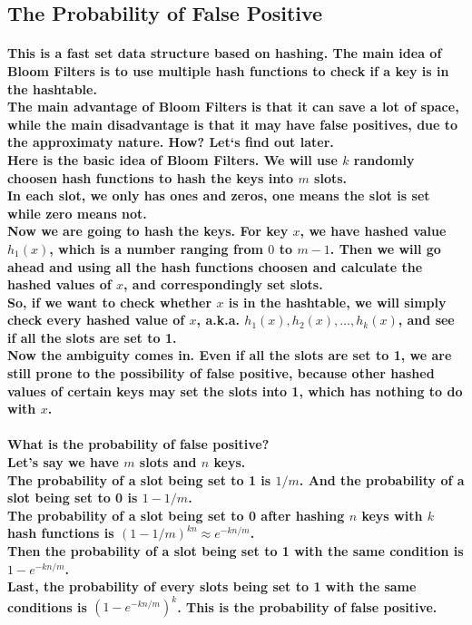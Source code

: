 \documentclass{article}
\begin{document}
\subsection{The Probability of False Positive}

\paragraph{This is a fast set data structure based on hashing. The main idea of Bloom Filters is to use multiple hash functions to 
check if a key is in the hashtable.\\
The main advantage of Bloom Filters is that it can save a lot of space, while the 
main disadvantage is that it may have false positives, due to the approximaty nature. How? Let`s find out later.\\
Here is the basic idea of Bloom Filters. We will use $k$ randomly choosen hash functions to hash the keys into $m$ slots.\\
In each slot, we only has ones and zeros, one means the slot is set while zero means not.\\
Now we are going to hash the keys. For key $x$, we have hashed value $h_1(x)$, which is a number ranging from $0$ to $m-1$.
Then we will go ahead and using all the hash functions choosen and calculate the hashed values of $x$, and correspondingly set slots.\\
So, if we want to check whether $x$ is in the hashtable, we will simply check every hashed value of $x$, 
a.k.a. $h_1(x), h_2(x), \ldots, h_k(x)$, and see if all the slots are set to 1.\\
Now the ambiguity comes in. Even if all the slots are set to 1, we are still prone to the possibility of false positive, because other hashed values 
of certain keys may set the slots into 1, which has nothing to do with $x$.\\}

\paragraph{What is the probability of false positive?\\
Let's say we have $m$ slots and $n$ keys.\\
The probability of a slot being set to 1 is $1/m$. And the probability of a slot being set to 0 is $1-1/m$.\\
The probability of a slot being set to 0 after hashing $n$ keys with $k$ hash functions is $(1-1/m)^{kn} \approx e^{-kn/m}$.\\
Then the probability of a slot being set to 1 with the same condition is $1-e^{-kn/m}$.\\
Last, the probability of every slots being set to 1 with the same conditions is $(1-e^{-kn/m})^k$. This is the probability of false positive.\\}
\end{document}
